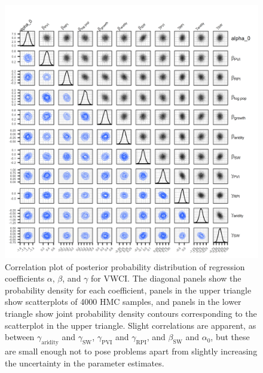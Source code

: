 \documentclass[draft]{agujournal}\usepackage{knitr}
\begin{document}
\begin{figure}
\includegraphics[width=6.25in]{figures_si/vwci_pairs_plot-1} \caption[Correlation plot of posterior probability distribution of regression coefficients $\alpha$, $\beta$, and $\gamma$ for VWCI]{Correlation plot of posterior probability distribution of regression coefficients $\alpha$, $\beta$, and $\gamma$ for VWCI. The diagonal panels show the probability density for each coefficient, panels in the upper triangle show scatterplots of 4000 HMC samples, and panels in the lower triangle show joint probability density contours corresponding to the scatterplot in the upper triangle. Slight correlations are apparent, as between $\gamma_{\text{aridity}}$ and $\gamma_{\text{SW}}$, $\gamma_{\text{PVI}}$ and $\gamma_{\text{RPI}}$, and $\beta_{\text{SW}}$ and $\alpha_0$, but these are small enough not to pose problems apart from slightly increasing the uncertainty in the parameter estimates.}\label{fig:vwci_pairs_plot}
\end{figure}



\end{document}
